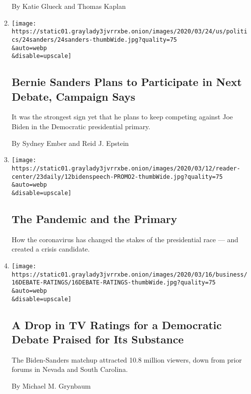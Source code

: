 \begin{enumerate}
  By Katie Glueck and Thomas Kaplan
\item
  \href{/2020/03/24/us/politics/biden-sanders-next-democratic-debate.html}{}

  \texttt{[image: https://static01.graylady3jvrrxbe.onion/images/2020/03/24/us/politics/24sanders/24sanders-thumbWide.jpg?quality=75\\\&auto=webp\\\&disable=upscale]}

  \hypertarget{bernie-sanders-plans-to-participate-in-next-debate-campaign-says}{%
  \subsection{Bernie Sanders Plans to Participate in Next Debate,
  Campaign
  Says}\label{bernie-sanders-plans-to-participate-in-next-debate-campaign-says}}

  It was the strongest sign yet that he plans to keep competing against
  Joe Biden in the Democratic presidential primary.

  By Sydney Ember and Reid J. Epstein
\item
  \href{/2020/03/23/podcasts/the-daily/democratic-primary-coronavirus.html}{}

  \texttt{[image: https://static01.graylady3jvrrxbe.onion/images/2020/03/12/reader-center/23daily/12bidenspeech-PROMO2-thumbWide.jpg?quality=75\\\&auto=webp\\\&disable=upscale]}

  \hypertarget{the-pandemic-and-the-primary}{%
  \subsection{The Pandemic and the
  Primary}\label{the-pandemic-and-the-primary}}

  How the coronavirus has changed the stakes of the presidential race
  --- and created a crisis candidate.
\item
  \href{/2020/03/16/business/media/cnn-debate-ratings-coronavirus.html}{}

  \texttt{[image: https://static01.graylady3jvrrxbe.onion/images/2020/03/16/business/16DEBATE-RATINGS/16DEBATE-RATINGS-thumbWide.jpg?quality=75\\\&auto=webp\\\&disable=upscale]}

  \hypertarget{a-drop-in-tv-ratings-for-a-democratic-debate-praised-for-its-substance}{%
  \subsection{A Drop in TV Ratings for a Democratic Debate Praised for
  Its
  Substance}\label{a-drop-in-tv-ratings-for-a-democratic-debate-praised-for-its-substance}}

  The Biden-Sanders matchup attracted 10.8 million viewers, down from
  prior forums in Nevada and South Carolina.

  By Michael M. Grynbaum
\end{enumerate}

